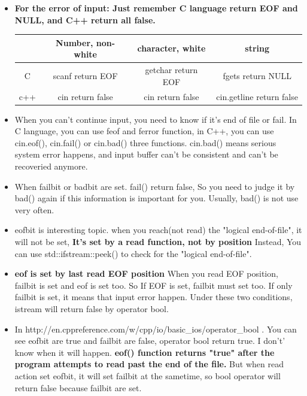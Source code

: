 \documentclass[a4paper,12pt,twoside]{book}
\begin{document}
\begin{itemize}
	\item \textbf{For the error of input: Just remember C language return EOF and NULL, and C++ return all false. }
	
	\begin{tabular}{|c|c|c|c|}
		\hline
		& Number, non-white & character, white  & string \\
		\hline
		C & scanf return EOF & getchar return EOF & fgets return NULL \\
		\hline
		c++ & cin return false & cin return false & cin.getline return false \\
		\hline
	\end{tabular}
	
	\item When you can't continue input, you need to know if it's end of file or fail. In C language, you can use feof and ferror function, in C++, you can use cin.eof(), cin.fail() or cin.bad() three functions. cin.bad() means serious system error happens, and input buffer can't be consistent and can't be recoveried anymore.
	
	\item When failbit or badbit are set. fail() return false, So you need to judge it by bad() again if this information is important for you.  Usually, bad() is not use very often.
	
	\item eofbit is interesting topic. when you reach(not read) the "logical end-of-file", it will not be set, \textbf{It's set by a read function, not by position}   Instead,  You can use std::ifstream::peek() to check for the "logical end-of-file".
	
	\item \textbf{eof is set by last read EOF position} When you read EOF position, failbit is set and eof is set too. So If EOF is set, failbit must set too.  If only failbit is set, it means that input error happen.  Under these two conditions, istream will return false by operator bool.
	
	\item In http://en.cppreference.com/w/cpp/io/basic\_ios/operator\_bool . You can see eofbit are true and failbit are false, operator bool return true. I don't' know when it will happen. \textbf{ eof() function returns "true" after the program attempts to read past the end of the file.}  But when read action set eofbit, it will set failbit at the sametime, so bool operator will return false because failbit are set.
	

\end{itemize}
\end{document}
